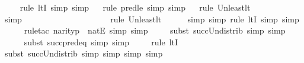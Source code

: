 \begin{isabellebody}
\ \ \ \isamarkupfalse%
{\isacharparenleft}{\kern0pt}rule\ ltI{\isacharcomma}{\kern0pt}\ simp{\isacharcomma}{\kern0pt}\ simp{\isacharparenright}{\kern0pt}\isanewline
\ \ \isamarkupfalse%
{\isacharparenleft}{\kern0pt}rule\ pred{\isacharunderscore}{\kern0pt}le{\isacharcomma}{\kern0pt}\ simp{\isacharcomma}{\kern0pt}\ simp{\isacharparenright}{\kern0pt}\isanewline
\ \ \isamarkupfalse%
{\isacharparenleft}{\kern0pt}rule\ Un{\isacharunderscore}{\kern0pt}least{\isacharunderscore}{\kern0pt}lt{\isacharparenright}{\kern0pt}{\isacharplus}{\kern0pt}\isanewline
\ \ \ \ \isamarkupfalse%
{\isacharparenleft}{\kern0pt}simp{\isacharparenright}{\kern0pt}\ \ \ \ \ \ \ \ \ \ \ \ \ \ \ \ \ \isanewline
\ \ \ \isamarkupfalse%
{\isacharparenleft}{\kern0pt}rule\ Un{\isacharunderscore}{\kern0pt}least{\isacharunderscore}{\kern0pt}lt{\isacharparenright}{\kern0pt}{\isacharplus}{\kern0pt}\isanewline
\ \ \ \ \isamarkupfalse%
\ {\isacharparenleft}{\kern0pt}simp{\isacharcomma}{\kern0pt}\ simp{\isacharcomma}{\kern0pt}\ rule\ ltI{\isacharcomma}{\kern0pt}\ simp{\isacharcomma}{\kern0pt}\ simp{\isacharparenright}{\kern0pt}\isanewline
\ \ \ \ \isamarkupfalse%
{\isacharparenleft}{\kern0pt}rule{\isacharunderscore}{\kern0pt}tac\ n{\isacharequal}{\kern0pt}{\isachardoublequoteopen}arity{\isacharparenleft}{\kern0pt}p{\isacharparenright}{\kern0pt}{\isachardoublequoteclose}\ \ natE{\isacharcomma}{\kern0pt}\ simp{\isacharcomma}{\kern0pt}\ simp{\isacharparenright}{\kern0pt}\isanewline
\ \ \ \ \isamarkupfalse%
{\isacharparenleft}{\kern0pt}subst\ succ{\isacharunderscore}{\kern0pt}Un{\isacharunderscore}{\kern0pt}distrib{\isacharcomma}{\kern0pt}\ simp{\isacharcomma}{\kern0pt}\ simp{\isacharparenright}{\kern0pt}\isanewline
\ \ \ \ \isamarkupfalse%
{\isacharparenleft}{\kern0pt}subst\ succ{\isacharunderscore}{\kern0pt}pred{\isacharunderscore}{\kern0pt}eq{\isacharcomma}{\kern0pt}\ simp{\isacharcomma}{\kern0pt}\ simp{\isacharparenright}{\kern0pt}\isanewline
\ \ \ \ \isamarkupfalse%
{\isacharparenleft}{\kern0pt}rule\ ltI{\isacharparenright}{\kern0pt}\isanewline
\ \ \ \isamarkupfalse%
{\isacharparenleft}{\kern0pt}subst\ succ{\isacharunderscore}{\kern0pt}Un{\isacharunderscore}{\kern0pt}distrib{\isacharcomma}{\kern0pt}\ simp{\isacharcomma}{\kern0pt}\ simp{\isacharcomma}{\kern0pt}\ simp{\isacharcomma}{\kern0pt}\ simp{\isacharparenright}{\kern0pt}\isanewline
\ \ \isamarkupfalse%
%
\endisatagproof

\end{isabellebody}

